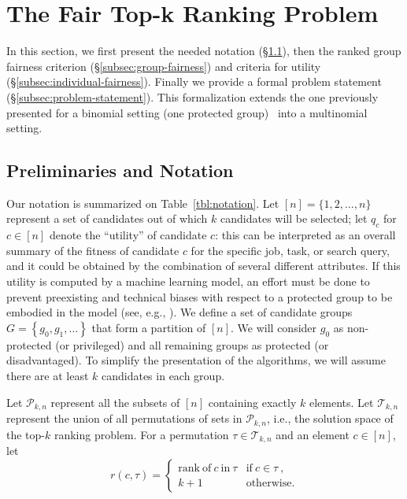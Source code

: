 
\section{The Fair Top-k Ranking Problem}\label{sec:problem}

In this section, we first present the needed notation (\S\ref{subsec:preliminaries}), then the ranked group fairness criterion (\S\ref{subsec:group-fairness}) and criteria for utility (\S\ref{subsec:individual-fairness}). Finally we provide a formal problem statement (\S\ref{subsec:problem-statement}).
%
This formalization extends the one previously presented for a binomial setting (one protected group)~\cite{zehlike2017fair} into a multinomial setting.

\subsection{Preliminaries and Notation}
\label{subsec:preliminaries}
Our notation is summarized on Table~\ref{tbl:notation}.
%
Let $[n] = \{ 1, 2, \dots, n \}$ represent a set of candidates out of which $k$ candidates will be selected; let $q_c$ for $c \in [n]$ denote the ``utility'' of candidate $c$: this can be interpreted as an overall summary of the fitness of candidate $c$ for the specific job, task, or search query, and it could be obtained by the combination of several different attributes.
%
If this utility is computed by a machine learning model, an effort must be done to prevent preexisting and technical biases with respect to a protected group to be embodied in the model (see, e.g., \cite{Sweeney2013}).
%
We define a set of candidate groups $G = \left\{ g_0, g_1, \ldots \right\}$ that form a partition of $[n]$. We will consider $g_0$ as non-protected (or privileged) and all remaining groups as protected (or disadvantaged).
%
To simplify the presentation of the algorithms, we will assume there are at least $k$ candidates in each group. %

Let ${\mathcal P}_{k,n}$ represent all the subsets of $[n]$ containing exactly $k$ elements.
%
Let ${\mathcal T}_{k,n}$ represent the union of all permutations of sets in ${\mathcal P}_{k,n}$, i.e., the solution space of the top-$k$ ranking problem.
%
For a permutation $\tau \in {\mathcal T}_{k,n}$ and an element $c \in [n]$, let
\[
r(c, \tau) = \begin{cases}
\mathrm{rank~of~} c \mathrm{~in~} \tau & \mathrm{if~} c \in \tau~, \\
k + 1 & \mathrm{otherwise}.
\end{cases}
\]

